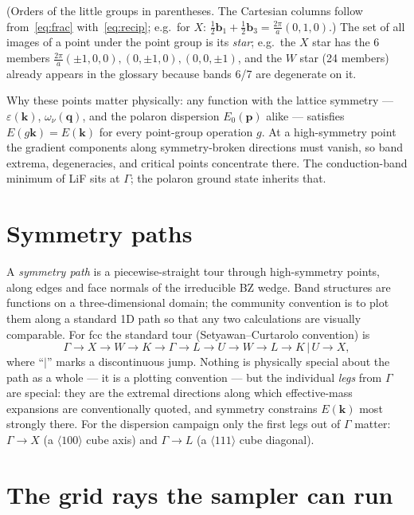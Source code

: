 \documentclass[11pt]{article}
\newcommand{\kv}{\mathbf{k}}
\newcommand{\qv}{\mathbf{q}}
\newcommand{\pv}{\mathbf{p}}
\newcommand{\bv}{\mathbf{b}}
\begin{document}
\noindent
(Orders of the little groups in parentheses. The Cartesian columns follow
from~\eqref{eq:frac} with~\eqref{eq:recip}; e.g.\ for $X$:
$\tfrac12\bv_{1}+\tfrac12\bv_{3}=\tfrac{2\pi}{a}(0,1,0)$.) The set of all images of a
point under the point group is its \emph{star}; e.g.\ the $X$ star has the 6 members
$\tfrac{2\pi}{a}(\pm1,0,0),(0,\pm1,0),(0,0,\pm1)$, and the $W$ star (24 members) already
appears in the glossary because bands 6/7 are degenerate on it.

Why these points matter physically: any function with the lattice symmetry ---
$\varepsilon(\kv)$, $\omega_{\nu}(\qv)$, and the polaron dispersion $E_{0}(\pv)$ alike
--- satisfies $E(g\kv)=E(\kv)$ for every point-group operation $g$. At a high-symmetry
point the gradient components along symmetry-broken directions must vanish, so band
extrema, degeneracies, and critical points concentrate there. The conduction-band
minimum of LiF sits at $\Gamma$; the polaron ground state inherits that.

\section{Symmetry paths}
\label{sec:paths}

A \emph{symmetry path} is a piecewise-straight tour through high-symmetry points, along
edges and face normals of the irreducible BZ wedge. Band structures are functions on a
three-dimensional domain; the community convention is to plot them along a standard 1D
path so that any two calculations are visually comparable. For fcc the standard tour
(Setyawan--Curtarolo convention) is
\begin{equation*}
\Gamma \to X \to W \to K \to \Gamma \to L \to U \to W \to L \to K \,\big|\, U \to X,
\end{equation*}
where ``$|$'' marks a discontinuous jump. Nothing is physically special about the path
as a whole --- it is a plotting convention --- but the individual \emph{legs} from
$\Gamma$ are special: they are the extremal directions along which effective-mass
expansions are conventionally quoted, and symmetry constrains $E(\kv)$ most strongly
there. For the dispersion campaign only the first legs out of $\Gamma$ matter:
$\Gamma\to X$ (a $\langle100\rangle$ cube axis) and $\Gamma\to L$ (a $\langle111\rangle$
cube diagonal).

\section{The grid rays the sampler can run}
\label{sec:rays}
\end{document}
